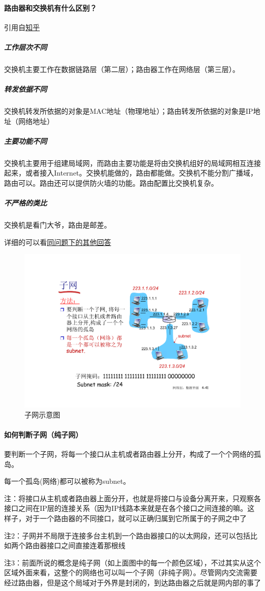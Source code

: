 \documentclass[]{report}
\newcommand*{\circled}[1]{\lower.7ex\hbox{\tikz\draw (0pt, 0pt)%
    circle (.5em) node {\makebox[1em][c]{\small #1}};}} %
\begin{document}
			\paragraph{路由器和交换机有什么区别？}
			引用自\href{https://www.zhihu.com/question/20465477/answer/18025629}{知乎}
				\subparagraph{工作层次不同}交换机主要工作在数据链路层（第二层）；路由器工作在网络层（第三层）。
				\subparagraph{转发依据不同}交换机转发所依据的对象是MAC地址（物理地址）；路由转发所依据的对象是IP地址（网络地址）
				\subparagraph{主要功能不同}交换机主要用于组建局域网，而路由主要功能是将由交换机组好的局域网相互连接起来，或者接入Internet。交换机能做的，路由都能做。交换机不能分割广播域，路由可以。路由还可以提供防火墙的功能。路由配置比交换机复杂。\subparagraph{不严格的类比}交换机是看门大爷，路由是邮差。\par
			详细的可以看\href{https://www.zhihu.com/question/20465477}{同问题下的其他回答}
			\begin{figure}[h]
				\centering
				\begin{minipage}{40em}
					\centering
					\includegraphics[scale = 0.5]{images/subnet.pdf}
					\caption{子网示意图}
				\end{minipage}
			\end{figure}
			\paragraph{如何判断子网（纯子网）}
			\begin{enumerate}[label = \circled{\arabic{*}}]
				\item 要判断一个子网，将每一个接口从主机或者路由器上分开，构成了一个个网络的孤岛。
				\item 每一个孤岛(网络)都可以被称为subnet。
			\end{enumerate}\par
			注：将接口从主机或者路由器上面分开，也就是将接口与设备分离开来，只观察各接口之间在IP层的连接关系（因为IP线路本来就是在各个接口之间连接的嘛。这样子，对于一个路由器的不同接口，就可以正确归属到它所属于的子网之中了\par
			注2：子网并不局限于连接多台主机到一个路由器接口的以太网段，还可以包括比如两个路由器接口之间直接连着那根线\par
			注3：前面所说的概念是纯子网（如上面图中的每一个颜色区域），不过其实从这个区域外面来看，这整个的网络也可以叫一个子网（非纯子网）。尽管网内交流需要经过路由器，但是这个局域对于外界是封闭的，到达路由器之后就是网内部的事了
\end{document}
